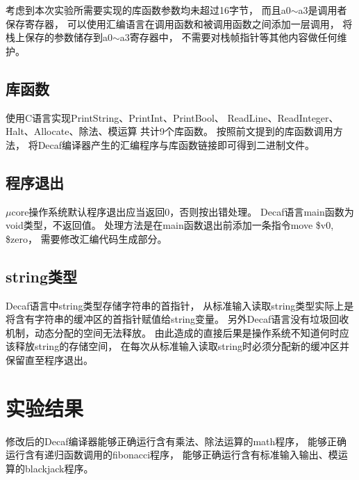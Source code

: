         考虑到本次实验所需要实现的库函数参数均未超过16字节，%
        而且a0$\sim$a3是调用者保存寄存器，%
        可以使用汇编语言在调用函数和被调用函数之间添加一层调用，%
        将栈上保存的参数储存到a0$\sim$a3寄存器中，%
        不需要对栈帧指针等其他内容做任何维护。

    \subsection{库函数}
        使用C语言实现PrintString、PrintInt、PrintBool、%
        ReadLine、ReadInteger、Halt、Allocate、除法、模运算%
        共计9个库函数。%
        按照前文提到的库函数调用方法，%
        将Decaf编译器产生的汇编程序与库函数链接即可得到二进制文件。

    \subsection{程序退出}
        $\mu$core操作系统默认程序退出应当返回0，否则按出错处理。%
        Decaf语言main函数为void类型，不返回值。%
        处理方法是在main函数退出前添加一条指令move \$v0, \$zero，%
        需要修改汇编代码生成部分。

    \subsection{string类型}
        Decaf语言中string类型存储字符串的首指针，%
        从标准输入读取string类型实际上是%
        将含有字符串的缓冲区的首指针赋值给string变量。%
        另外Decaf语言没有垃圾回收机制，动态分配的空间无法释放。%
        由此造成的直接后果是操作系统不知道何时应该释放string的存储空间，%
        在每次从标准输入读取string时必须分配新的缓冲区并保留直至程序退出。


\section{实验结果}
    修改后的Decaf编译器能够正确运行含有乘法、除法运算的math程序，%
    能够正确运行含有递归函数调用的fibonacci程序，%
    能够正确运行含有标准输入输出、模运算的blackjack程序。


